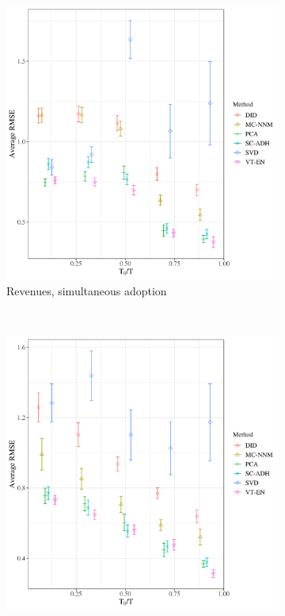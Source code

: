 \documentclass[12pt]{article}
\begin{document}
\begin{figure}[htbp]
\begin{subfigure}[t]{0.48\textwidth}
		\includegraphics[width=\textwidth]{plots/rev_pc_N_18_T_158_numruns_20_num_treated_9_simultaneuous_1.png}
		\caption{Revenues, simultaneous adoption}
	\end{subfigure}
	~ 
	\begin{subfigure}[t]{0.48\textwidth}
	\centering
	\includegraphics[width=\textwidth]{plots/exp_pc_N_17_T_159_numruns_20_num_treated_9_simultaneuous_0.png}

\end{subfigure}
\end{figure}
\end{document}
